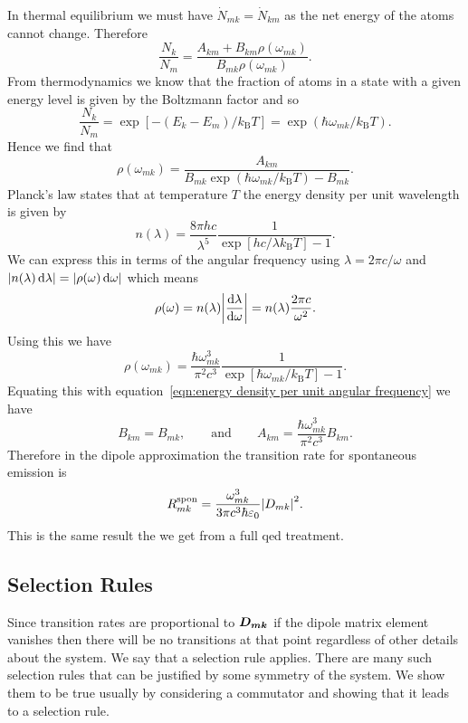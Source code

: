 \documentclass[a4paper]{article}
\newcommand{\boltzmann}{k_\mathrm{B}}
\begin{document}
    In thermal equilibrium we must have \(\dot{N}_{mk} = \dot{N}_{km}\) as the net energy of the atoms cannot change.
    Therefore
    \[\frac{N_k}{N_m} = \frac{A_{km} + B_{km}\rho(\omega_{mk})}{B_{mk}\rho(\omega_{mk})}.\]
    From thermodynamics we know that the fraction of atoms in a state with a given energy level is given by the Boltzmann factor and so
    \[\frac{N_k}{N_m} = \exp[-(E_k - E_m)/\boltzmann T] = \exp(\hbar\omega_{mk}/\boltzmann T).\]
    Hence we find that
    \begin{equation}\label{eqn:energy density per unit angular frequency}
        \rho(\omega_{mk}) = \frac{A_{km}}{B_{mk}\exp(\hbar\omega_{mk}/\boltzmann T) - B_{mk}}.
    \end{equation}
    Planck's law states that at temperature \(T\) the energy density per unit wavelength is given by
    \[n(\lambda) = \frac{8\pi hc}{\lambda^5}\frac{1}{\exp[hc/\lambda \boltzmann T] - 1}.\]
    We can express this in terms of the angular frequency using \(\lambda = 2\pi c/\omega\) and \(\abs{n(\lambda)\dd{\lambda}} = \abs{\rho(\omega)\dd{\omega}}\) which means
    \[\rho(\omega) = n(\lambda)\abs{\dv{\lambda}{\omega}} = n(\lambda)\frac{2\pi c}{\omega^2}.\]
    Using this we have
    \[\rho(\omega_{mk}) = \frac{\hbar\omega_{mk}^3}{\pi^2c^3}\frac{1}{\exp[\hbar\omega_{mk}/\boltzmann T] - 1}.\]
    Equating this with equation~\ref{eqn:energy density per unit angular frequency} we have
    \[B_{km} = B_{mk}, \qquad\text{and}\qquad A_{km} = \frac{\hbar\omega_{mk}^3}{\pi^2c^3}B_{km}.\]
    Therefore in the dipole approximation the transition rate for spontaneous emission is
    \[R_{mk}^{\mathrm{spon}} = \frac{\omega_{mk}^3}{3\pi c^3\hbar\varepsilon_0}\abs{D_{mk}}^2.\]
    This is the same result the we get from a full \gls{qed} treatment.
    
    \subsection{Selection Rules}
    Since transition rates are proportional to \(\bm{D_{mk}}\) if the dipole matrix element vanishes then there will be no transitions at that point regardless of other details about the system.
    We say that a selection rule applies.
    There are many such selection rules that can be justified by some symmetry of the system.
    We show them to be true usually by considering a commutator and showing that it leads to a selection rule.
    
\end{document}
